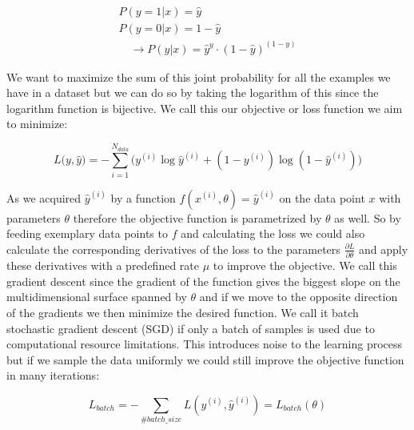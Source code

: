 \documentclass[a4paper,12pt]{article}
\begin{document}
\vspace{4mm}

\begin{align}
    P(y = 1 | x) = \hat{y} \\
    P(y = 0 | x) = 1 - \hat{y} \\
    \quad \rightarrow P(y | x) = \hat{y}^{y} \cdot (1 - \hat{y})^{(1-y)}
\end{align}

\vspace{4mm}

\par We want to maximize the sum of this joint probability for all the examples we have in a dataset but we can do so by taking the logarithm of this since the logarithm function is bijective. We call this our objective or loss function we aim to minimize:

\vspace{4mm}

\begin{equation}
    L\big(y, \hat{y}\big) = -\sum_{i = 1}^{N_{data}} \Big(y^{(i)}\log\hat{y}^{(i)} + (1 - y^{(i)})\log(1 - \hat{y}^{(i)})\Big)
\end{equation}

\vspace{4mm}

\par As we acquired $\hat{y}^{(i)}$ by a function $f(x^{(i)}, \theta) = \hat{y}^{(i)}$ on the data point $x$ with parameters $\theta$ therefore the objective function is parametrized by $\theta$ as well. So by feeding exemplary data points to $f$ and calculating the loss we could also calculate the corresponding derivatives of the loss to the parameters $\frac{\partial L}{\partial \theta}$ and apply these derivatives with a predefined rate $\mu$ to improve the objective. We call this gradient descent since the gradient of the function gives the biggest slope on the multidimensional surface spanned by $\theta$ and if we move to the opposite direction of the gradients we then minimize the desired function. We call it batch stochastic gradient descent (SGD) if only a batch of samples is used due to computational resource limitations. This introduces noise to the learning process but if we sample the data uniformly we could still improve the objective function in many iterations:

\vspace{4mm}

\begin{equation}
    L_{batch} = - \sum_{\#batch\_size}L(y^{(i)}, \hat{y}^{(i)}) = L_{batch}(\theta)  
\end{equation}
\end{document}
